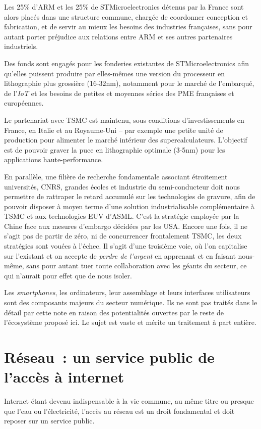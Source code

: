 \documentclass[a4paper]{article}
\begin{document}
Les 25\% d’ARM et les 25\% de STMicroelectronics détenus par la France sont alors placés dans une structure commune, chargée de coordonner conception et fabrication, et de servir au mieux les besoins des industries françaises, sans pour autant porter préjudice aux relations entre ARM et ses autres partenaires industriels. 

Des fonds sont engagés pour les fonderies existantes de STMicroelectronics afin qu’elles puissent produire par elles-mêmes une version du processeur en lithographie plus grossière (16-32nm), notamment pour le marché de l’embarqué, de l’\textit{IoT} et les besoins de petites et moyennes séries des PME françaises et européennes.

Le partenariat avec TSMC est maintenu, sous conditions d’investissements en France, en Italie et au Royaume-Uni – par exemple une petite unité de production pour alimenter le marché intérieur des supercalculateurs. L’objectif est de pouvoir graver la puce en lithographie optimale (3-5nm) pour les applications haute-performance. 

En parallèle, une filière de recherche fondamentale associant étroitement universités, CNRS, grandes écoles et industrie du semi-conducteur doit nous permettre de rattraper le retard accumulé sur les technologies de gravure, afin de pouvoir disposer à moyen terme d’une solution industrialisable complémentaire à TSMC et aux technologies EUV d’ASML.  
C’est la stratégie employée par la Chine face aux mesures d’embargo décidées par les USA. Encore une fois, il ne s’agit pas de partir de zéro, ni de concurrencer frontalement TSMC, les deux stratégies sont vouées à l’échec. Il s’agit d’une troisième voie, où l’on capitalise sur l’existant et on accepte de \emph{perdre de l’argent} en apprenant et en faisant nous-même, sans pour autant tuer toute collaboration avec les géants du secteur, ce qui n’aurait pour effet que de nous isoler.

Les \textit{smartphones}, les ordinateurs, leur assemblage et leurs interfaces utilisateurs sont des composants majeurs du secteur numérique. Ils ne sont pas traités dans le détail par cette note en raison des potentialités ouvertes par le reste de l’écosystème proposé ici. Le sujet est vaste et mérite un traitement à part entière.

\section{Réseau~: un service public de l’accès à internet}
Internet étant devenu indispensable à la vie commune, au même titre ou presque que l’eau ou l’électricité, l’accès au réseau est un droit fondamental et doit reposer sur un service public. 
\end{document}
